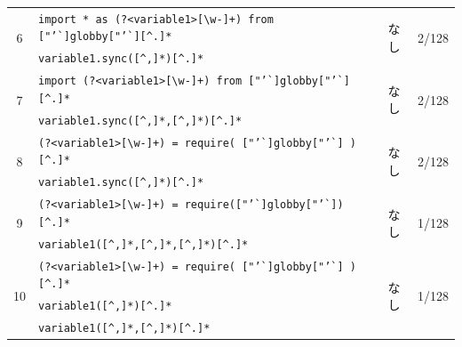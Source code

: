 \documentclass[11pt]{jreport}
\begin{document}
\begin{table}[t]
{\begin{tabular}{c|l|c|r}
            \multirow{2}{*}{6} & \texttt{import * as (?\textless{}variable1\textgreater{}{[}\textbackslash{}w-{]}+) from ["'\`{}]globby["'\`{}][\^{}.]*} & \multirow{2}{*}{なし}  &  \multirow{2}{*}{2/128} \\ \cline{2-2}
            & \texttt{variable1.sync([\textasciicircum,]*)[\^{}.]*} & & \\ \hline

            \multirow{2}{*}{7} & \texttt{import (?\textless{}variable1\textgreater{}{[}\textbackslash{}w-{]}+) from ["'\`{}]globby["'\`{}][\^{}.]*} & \multirow{2}{*}{なし}  &  \multirow{2}{*}{2/128} \\ \cline{2-2}
            & \texttt{variable1.sync([\textasciicircum,]*,[\textasciicircum,]*)[\^{}.]*} & & \\ \hline

            \multirow{2}{*}{8} & \texttt{(?\textless{}variable1\textgreater{}{[}\textbackslash{}w-{]}+) = require( ["'\`{}]globby["'\`{}] )[\^{}.]*} & \multirow{2}{*}{なし} & \multirow{2}{*}{2/128}\\ \cline{2-2}
            & \texttt{variable1.sync([\textasciicircum,]*)[\^{}.]*} & & \\ \hline
            
            \multirow{2}{*}{9} & \texttt{(?\textless{}variable1\textgreater{}{[}\textbackslash{}w-{]}+) = require(["'\`{}]globby["'\`{}])[\^{}.]*} & \multirow{2}{*}{なし} & \multirow{2}{*}{1/128}\\ \cline{2-2}
            & \texttt{variable1([\textasciicircum,]*,[\textasciicircum,]*,[\textasciicircum,]*)[\^{}.]*} & & \\ \hline

            \multirow{3}{*}{10} & \texttt{(?\textless{}variable1\textgreater{}{[}\textbackslash{}w-{]}+) = require( ["'\`{}]globby["'\`{}] )[\^{}.]*} & \multirow{3}{*}{なし} & \multirow{3}{*}{1/128}\\ \cline{2-2}
            & \texttt{variable1([\textasciicircum,]*)[\^{}.]*} & & \\ \hline
            & \texttt{variable1([\textasciicircum,]*,[\textasciicircum,]*)[\^{}.]*} & & \\ \hline
            
        \end{tabular}
    }
\end{table}
\end{document}
